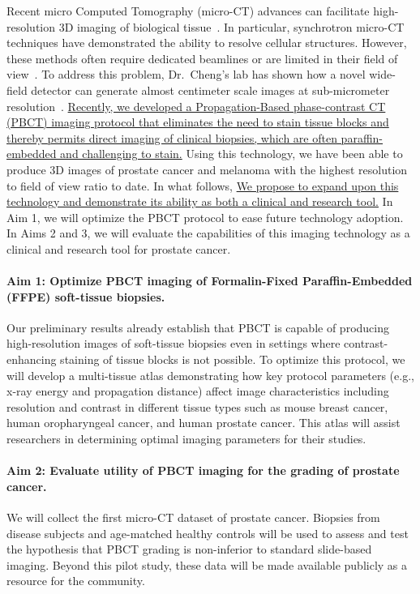 \documentclass{NIHGrant}
\theoremstyle{theorem}
\begin{document}
Recent micro Computed Tomography (micro-CT) advances can facilitate high-resolution 3D imaging of biological tissue~\cite{albers_x-ray-based_2018,katsamenis_x-ray_2019}. In particular, synchrotron micro-CT techniques have demonstrated the ability to resolve cellular structures. However, these methods often require dedicated beamlines or are limited in their field of view~\cite{topperwien_contrast_2019,pinkert-leetsch_three-dimensional_2023,frost_3d_2023}. To address this problem, Dr.~Cheng's lab has shown how a novel wide-field detector can generate almost centimeter scale images at sub-micrometer resolution~\cite{yakovlev_wide-field_2022}. \uline{Recently, we developed a Propagation-Based phase-contrast CT (PBCT) imaging protocol that eliminates the need to stain tissue blocks and thereby permits direct imaging of clinical biopsies, which are often paraffin-embedded and challenging to stain.} Using this technology, we have been able to produce 3D images of prostate cancer and melanoma with the highest resolution to field of view ratio to date. In what follows, \uline{We propose to expand upon this technology and demonstrate its ability as both a clinical and research tool.} In Aim 1, we will optimize the PBCT protocol to ease future technology adoption. In Aims 2 and 3, we will evaluate the capabilities of this imaging technology as a clinical and research tool for prostate cancer.

\noindent
\paragraph*{Aim 1: Optimize PBCT imaging of Formalin-Fixed Paraffin-Embedded (FFPE) soft-tissue biopsies.}
Our preliminary results already establish that PBCT is capable of producing high-resolution images of soft-tissue biopsies even in settings where contrast-enhancing staining of tissue blocks is not possible. To optimize this protocol, we will develop a multi-tissue atlas demonstrating how key protocol parameters (e.g., x-ray energy and propagation distance) affect image characteristics including resolution and contrast in different tissue types such as mouse breast cancer, human oropharyngeal cancer, and human prostate cancer. This atlas will assist researchers in determining optimal imaging parameters for their studies.

\paragraph*{Aim 2: Evaluate utility of PBCT imaging for the grading of prostate cancer.}
We will collect the first micro-CT dataset of prostate cancer. Biopsies from disease subjects and age-matched healthy controls will be used to
assess and test the hypothesis that PBCT grading is non-inferior to standard slide-based imaging. Beyond this pilot study, these data will be made available publicly as a resource for the community.
\end{document}
